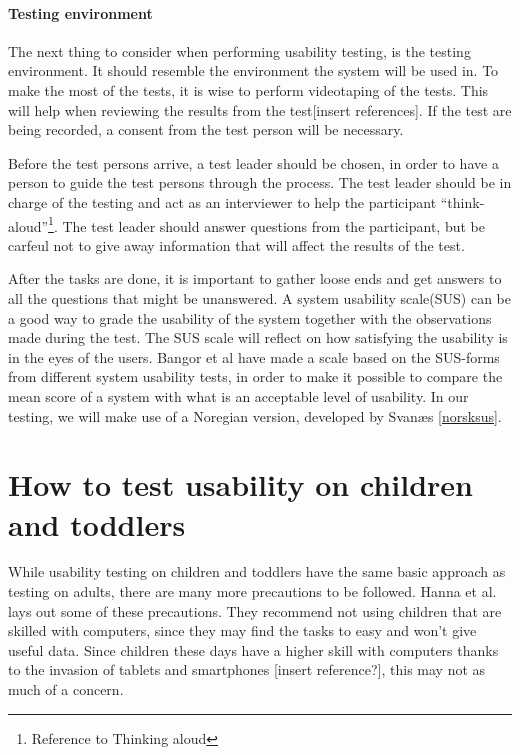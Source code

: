 \paragraph{Testing environment}
\label{testingenvironment}
The next thing to consider when performing usability testing, is the testing environment. It should resemble the environment the system will be used in. To make the most of the tests, it is wise to perform videotaping of the tests. This will help when reviewing the results from the test[insert references]. If the test are being recorded, a consent from the test person will be necessary.

Before the test persons arrive, a test leader should be chosen, in order to have a person to guide the test persons through the process. The test leader should be in charge of the testing and act as an interviewer to help the participant ``think-aloud''\footnote{Reference to Thinking aloud}. The test leader should answer questions from the participant, but be carfeul not to give away information that will affect the results of the test.

After the tasks are done, it is important to gather loose ends and get answers to all the questions that might be unanswered. A system usability scale(SUS)\cite{sus} can be a good way to grade the usability of the system together with the observations made during the test. The SUS scale will reflect on how satisfying the usability is in the eyes of the users. Bangor et al \cite{susform} have made a scale based on the SUS-forms from different system usability tests, in order to make it possible to compare the mean score of a system with what is an acceptable level of usability. In our testing, we will make use of a Noregian version, developed by Svanæs \ref{norsksus}.

\section{How to test usability on children and toddlers}
While usability testing on children and toddlers have the same basic approach as testing on adults, there are many more precautions to be followed. 
Hanna et al. \cite{testingenvironmentforchildren} lays out some of these precautions. They recommend not using children that are skilled with computers, since they may find the tasks to easy and won't give useful data. 
Since children these days have a higher skill with computers thanks to the invasion of tablets and smartphones [insert reference?], this may not as much of a concern. 

